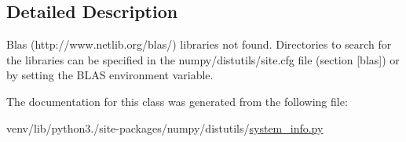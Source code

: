 \subsection{Detailed Description}
\begin{DoxyVerb}Blas (http://www.netlib.org/blas/) libraries not found.
Directories to search for the libraries can be specified in the
numpy/distutils/site.cfg file (section [blas]) or by setting
the BLAS environment variable.\end{DoxyVerb}
 

The documentation for this class was generated from the following file\+:\begin{DoxyCompactItemize}
\item 
venv/lib/python3./site-\/packages/numpy/distutils/\hyperlink{system__info_8py}{system\+\_\+info.\+py}\end{DoxyCompactItemize}
